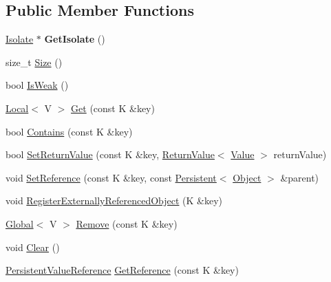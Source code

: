 \subsection*{Public Member Functions}
\begin{DoxyCompactItemize}
\item 
\hyperlink{classv8_1_1_isolate}{Isolate} $\ast$ {\bfseries Get\+Isolate} ()\hypertarget{classv8_1_1_persistent_value_map_base_a80da7adc6e8bdb166912075346116978}{}\label{classv8_1_1_persistent_value_map_base_a80da7adc6e8bdb166912075346116978}

\item 
size\+\_\+t \hyperlink{classv8_1_1_persistent_value_map_base_ade5c5db2a968fdabe073649e85b837eb}{Size} ()
\item 
bool \hyperlink{classv8_1_1_persistent_value_map_base_a9f824b13dd30605589508db2740dd678}{Is\+Weak} ()
\item 
\hyperlink{classv8_1_1_local}{Local}$<$ V $>$ \hyperlink{classv8_1_1_persistent_value_map_base_a16b8f906ea42036c2f37d44813bf2a72}{Get} (const K \&key)
\item 
bool \hyperlink{classv8_1_1_persistent_value_map_base_a8c68e5f99c4042541c6d32232c97282a}{Contains} (const K \&key)
\item 
bool \hyperlink{classv8_1_1_persistent_value_map_base_a85201649d2bbd0ffdebe8be3d5c6447a}{Set\+Return\+Value} (const K \&key, \hyperlink{classv8_1_1_return_value}{Return\+Value}$<$ \hyperlink{classv8_1_1_value}{Value} $>$ return\+Value)
\item 
void \hyperlink{classv8_1_1_persistent_value_map_base_a6fa5f720b283dd9fa626a67e7687dcd0}{Set\+Reference} (const K \&key, const \hyperlink{classv8_1_1_persistent}{Persistent}$<$ \hyperlink{classv8_1_1_object}{Object} $>$ \&parent)
\item 
void \hyperlink{classv8_1_1_persistent_value_map_base_a7d1cd63172b997dfaac9d0f009edd709}{Register\+Externally\+Referenced\+Object} (K \&key)
\item 
\hyperlink{classv8_1_1_global}{Global}$<$ V $>$ \hyperlink{classv8_1_1_persistent_value_map_base_abd75a4c050416712167ba0bb9eace097}{Remove} (const K \&key)
\item 
void \hyperlink{classv8_1_1_persistent_value_map_base_a1bf074e7a7c24713c9a3d40ddce89e74}{Clear} ()
\item 
\hyperlink{classv8_1_1_persistent_value_map_base_1_1_persistent_value_reference}{Persistent\+Value\+Reference} \hyperlink{classv8_1_1_persistent_value_map_base_a52e74c69b94c7ce77a65af9f32d68af4}{Get\+Reference} (const K \&key)
\end{DoxyCompactItemize}
